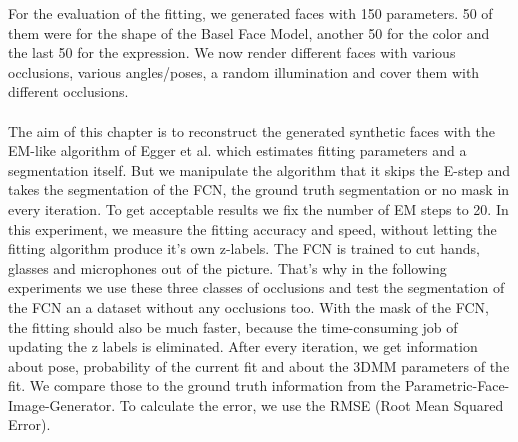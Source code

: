For the evaluation of the fitting, we generated faces with 150 parameters. 50 of them were for the shape of the Basel Face Model, another 50 for the color and the last 50 for the expression. We now render different faces with various occlusions, various angles/poses, a random illumination and cover them with different occlusions.\\
\\
The aim of this chapter is to reconstruct the generated synthetic faces with the EM-like algorithm of Egger et al. which estimates fitting parameters and a segmentation itself. But we manipulate the algorithm that it skips the E-step and takes the segmentation of the FCN, the ground truth segmentation or no mask in every iteration. To get acceptable results we fix the number of EM steps to 20. In this experiment, we measure the fitting accuracy and speed, without letting the fitting algorithm produce it's own z-labels. The FCN is trained to cut hands, glasses and microphones out of the picture. That's why in the following experiments we use these three classes of occlusions and test the segmentation of the FCN an a dataset without any occlusions too. With the mask of the FCN, the fitting should also be much faster, because the time-consuming job of updating the z labels is eliminated. After every iteration, we get information about pose, probability of the current fit and about the 3DMM parameters of the fit. We compare those to the ground truth information from the Parametric-Face-Image-Generator. To calculate the error, we use the RMSE (Root Mean Squared Error).\\
\\


